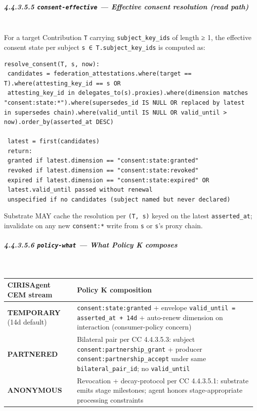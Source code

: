 \documentclass[11pt]{article}
\begin{document}
\subparagraph{4.4.3.5.5 \texttt{consent-effective} — Effective consent resolution (read path)}\mbox{}\\


For a target Contribution \texttt{T} carrying \texttt{subject\_key\_ids} of length ≥ 1, the effective consent state per subject \texttt{s ∈ T.subject\_key\_ids} is computed as:


\begin{lstlisting}
resolve_consent(T, s, now):
 candidates = federation_attestations.where(target == T).where(attesting_key_id == s OR
 attesting_key_id in delegates_to(s).proxies).where(dimension matches "consent:state:*").where(supersedes_id IS NULL OR replaced by latest in supersedes chain).where(valid_until IS NULL OR valid_until > now).order_by(asserted_at DESC)

 latest = first(candidates)
 return:
 granted if latest.dimension == "consent:state:granted"
 revoked if latest.dimension == "consent:state:revoked"
 expired if latest.dimension == "consent:state:expired" OR
 latest.valid_until passed without renewal
 unspecified if no candidates (subject named but never declared)
\end{lstlisting}

Substrate MAY cache the resolution per \texttt{(T, s)} keyed on the latest \texttt{asserted\_at}; invalidate on any new \texttt{consent:*} write from \texttt{s} or \texttt{s}'s proxy chain.


\subparagraph{4.4.3.5.6 \texttt{policy-what} — What Policy K composes}\mbox{}\\


{\footnotesize
\begin{longtable}{|p{8.0cm}|p{8.0cm}|}\hline
\textbf{CIRISAgent CEM stream} & \textbf{Policy K composition} \\ \hline\endhead
\textbf{TEMPORARY} (14d default) & \texttt{consent:state:granted} + envelope \texttt{valid\_until = asserted\_at + 14d} + auto-renew dimension on interaction (consumer-policy concern) \\ \hline
\textbf{PARTNERED} & Bilateral pair per CC 4.4.3.5.3: subject \texttt{consent:partnership\_grant} + producer \texttt{consent:partnership\_accept} under same \texttt{bilateral\_pair\_id}; no \texttt{valid\_until} \\ \hline
\textbf{ANONYMOUS} & Revocation + decay-protocol per CC 4.4.3.5.1: substrate emits stage milestones; agent honors stage-appropriate processing constraints \\ \hline
\end{longtable}}
\end{document}

